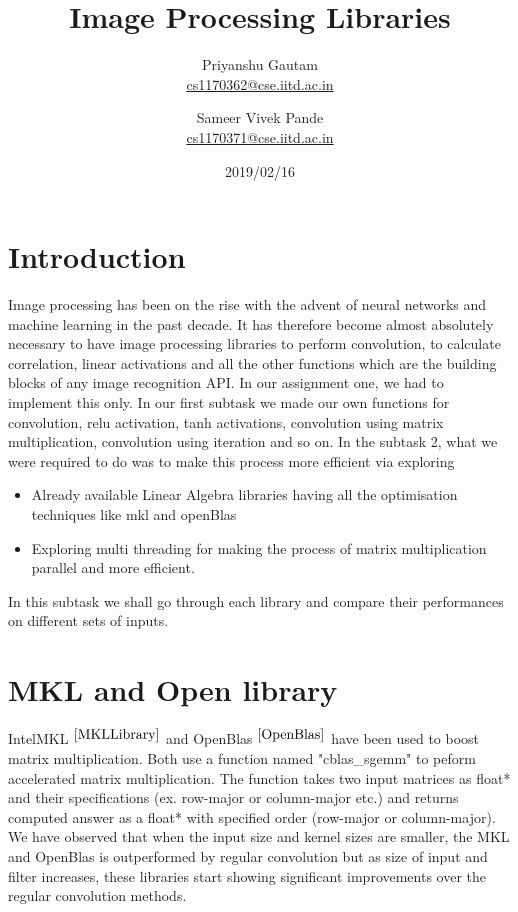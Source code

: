 \documentclass[a4paper]{article}
\title{Image Processing Libraries}
\author{Priyanshu Gautam \\  \href{mailto:cs1170362@cse.iitd.ac.in}{cs1170362@cse.iitd.ac.in} 
   \and Sameer Vivek Pande \\  \href{mailto:cs1170371@cse.iitd.ac.in}{cs1170371@cse.iitd.ac.in} }
\date{2019/02/16}
\begin{document}
\maketitle

\section{Introduction}

Image processing has been on the rise with the advent of neural networks and machine learning in the past decade. It has therefore become almost absolutely necessary to have image processing libraries to perform convolution, to calculate correlation, linear activations and all the other functions which are the building blocks of any image recognition API.
In our assignment one, we had to implement this only. In our first subtask we made our own functions for convolution, relu activation, tanh activations, convolution using matrix multiplication, convolution using iteration and so on. In the subtask 2, what we were required to do was to make this process more efficient via exploring \begin{itemize}
\item Already available Linear Algebra libraries having all the optimisation techniques like mkl and openBlas
\item Exploring multi threading for making the process of matrix multiplication parallel and more efficient.
\end {itemize}

In this subtask we shall go through each library and compare their performances on different sets of inputs.



\section{MKL and Open library}
IntelMKL $^{ \cite{MKLLibrary}}$ and OpenBlas $^{\cite{OpenBlas}}$ have been used to boost matrix multiplication. Both use a function named "cblas\_sgemm" to peform accelerated matrix multiplication. The function takes two input matrices as float* and their specifications (ex. row-major or column-major etc.) and returns computed answer as a float* with specified order (row-major or column-major).
We have observed that when the input size and kernel sizes are smaller, the MKL and OpenBlas is outperformed by regular convolution but as size of input and filter increases, these libraries start showing significant improvements over the regular convolution methods. 
\end{document}
